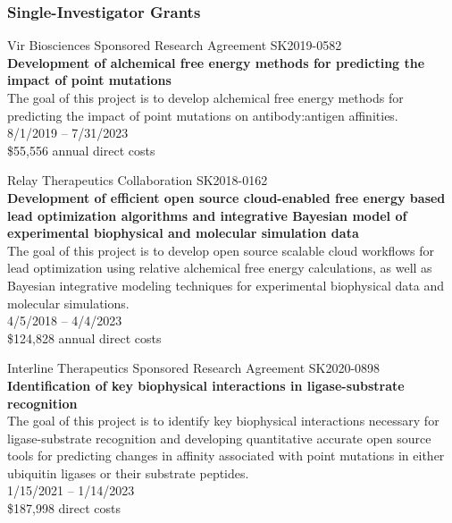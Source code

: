 \documentclass[10pt]{article}
\begin{document}
\subsubsection*{Single-Investigator Grants}


Vir Biosciences Sponsored Research Agreement SK2019-0582 \\
{\bf Development of alchemical free energy methods for predicting the impact of point mutations}\\
The goal of this project is to develop alchemical free energy methods for predicting the impact of point mutations on antibody:antigen affinities.\\
8/1/2019 -- 7/31/2023\\
\$55,556 annual direct costs

\vspace{1.5ex}

Relay Therapeutics Collaboration SK2018-0162\\
{\bf Development of efficient open source cloud-enabled free energy based lead optimization algorithms and integrative Bayesian model of experimental biophysical and molecular simulation data} \\
The goal of this project is to develop open source scalable cloud workflows for lead optimization using relative alchemical free energy calculations, as well as Bayesian integrative modeling techniques for experimental biophysical data and molecular simulations. \\
4/5/2018 -- 4/4/2023 \\
\$124,828 annual direct costs

\vspace{1.5ex}

Interline Therapeutics Sponsored Research Agreement SK2020-0898 \\
{\bf Identification of key biophysical interactions in ligase-substrate recognition} \\
The goal of this project is to identify key biophysical interactions necessary for ligase-substrate recognition and developing quantitative accurate open source tools for predicting changes in affinity associated with point mutations in either ubiquitin ligases or their substrate peptides. \\
1/15/2021 -- 1/14/2023\\
\$187,998 direct costs


\end{document}
